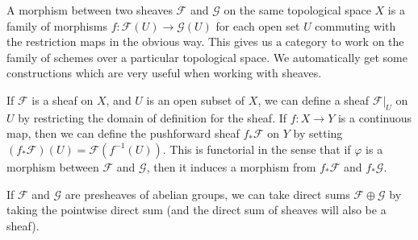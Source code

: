 A morphism between two sheaves $\mathcal{F}$ and $\mathcal{G}$ on the same topological space $X$ is a family of morphisms $f: \mathcal{F}(U) \to \mathcal{G}(U)$ for each open set $U$ commuting with the restriction maps in the obvious way. This gives us a category to work on the family of schemes over a particular topological space. We automatically get some constructions which are very useful when working with sheaves.

\begin{example}
    If $\mathcal{F}$ is a sheaf on $X$, and $U$ is an open subset of $X$, we can define a sheaf $\mathcal{F}|_U$ on $U$ by restricting the domain of definition for the sheaf. If $f: X \to Y$ is a continuous map, then we can define the pushforward sheaf $f_* \mathcal{F}$ on $Y$ by setting $(f_* \mathcal{F})(U) = \mathcal{F}(f^{-1}(U))$. This is functorial in the sense that if $\varphi$ is a morphism between $\mathcal{F}$ and $\mathcal{G}$, then it induces a morphism from $f_* \mathcal{F}$ and $f_* \mathcal{G}$.
\end{example}

\begin{example}
    If $\mathcal{F}$ and $\mathcal{G}$ are presheaves of abelian groups, we can take direct sums $\mathcal{F} \oplus \mathcal{G}$ by taking the pointwise direct sum (and the direct sum of sheaves will also be a sheaf).
\end{example}

